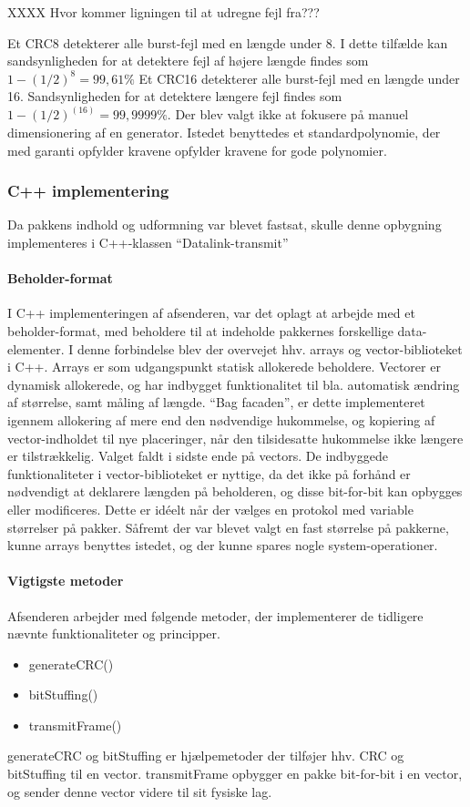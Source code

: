 XXXX Hvor kommer ligningen til at udregne fejl fra???

Et CRC8 detekterer alle burst-fejl med en længde under 8. I dette tilfælde kan sandsynligheden for at detektere fejl af højere længde findes som $1-(1/2)^8 = 99,61\%$
Et CRC16 detekterer alle burst-fejl med en længde under 16. Sandsynligheden for at detektere længere fejl findes som $1-(1/2)^(16) = 99,9999\%.$
    Der blev valgt ikke at fokusere på manuel dimensionering af en generator. Istedet benyttedes et standardpolynomie, der med garanti opfylder kravene opfylder kravene for gode polynomier.

\subsubsection{C++ implementering}
Da pakkens indhold og udformning var blevet fastsat, skulle denne opbygning implementeres i C++-klassen “Datalink-transmit”

\paragraph{Beholder-format}\hfill \break
I C++ implementeringen af afsenderen, var det oplagt at arbejde med et beholder-format, med beholdere til at indeholde pakkernes forskellige data-elementer.
I denne forbindelse blev der overvejet hhv. arrays og vector-biblioteket i C++. 
Arrays er som udgangspunkt statisk allokerede beholdere.
Vectorer er dynamisk allokerede, og har indbygget funktionalitet til bla. automatisk ændring af størrelse, samt måling af længde. “Bag facaden”, er dette implementeret igennem allokering af mere end den nødvendige hukommelse, og kopiering af vector-indholdet til nye placeringer, når den tilsidesatte hukommelse ikke længere er tilstrækkelig. 
Valget faldt i sidste ende på vectors. De indbyggede funktionaliteter i vector-biblioteket er nyttige, da det ikke på forhånd er nødvendigt at deklarere længden på beholderen, og disse bit-for-bit kan opbygges eller modificeres. Dette er idéelt når der vælges en protokol med variable størrelser på pakker. Såfremt der var blevet valgt en fast størrelse på pakkerne, kunne arrays benyttes istedet, og der kunne spares nogle system-operationer.

\paragraph{Vigtigste metoder}\hfill \break
Afsenderen arbejder med følgende metoder, der implementerer de tidligere nævnte funktionaliteter og principper.
\begin{itemize}[noitemsep]
  \item generateCRC()
  \item bitStuffing()
  \item transmitFrame()
  \end{itemize}
generateCRC og bitStuffing er hjælpemetoder der tilføjer hhv. CRC og bitStuffing til en vector.
transmitFrame opbygger en pakke bit-for-bit i en vector, og sender denne vector videre til sit fysiske lag.

